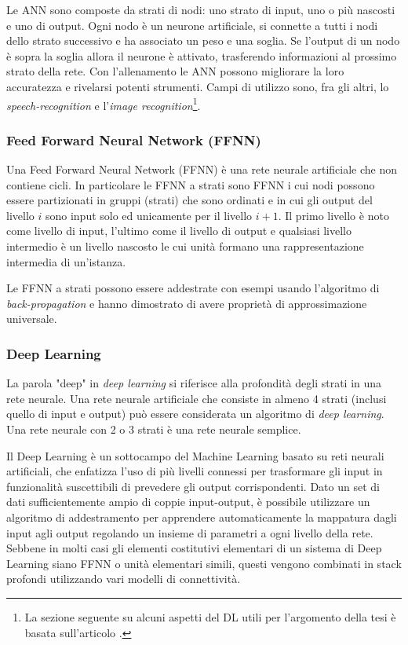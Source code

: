 \par Le ANN sono composte da strati di nodi: uno strato di input, uno o più nascosti e uno di output. Ogni nodo è un neurone artificiale, si connette a tutti i nodi dello strato successivo e ha associato un peso e una soglia. Se l'output di un nodo è sopra la soglia allora il neurone è attivato, trasferendo informazioni al prossimo strato della rete. Con l'allenamento le ANN possono migliorare la loro accuratezza e rivelarsi potenti strumenti. Campi di utilizzo sono, fra gli altri, lo \textit{speech-recognition} e l'\textit{image recognition}\footnote{La sezione seguente su alcuni aspetti del DL utili per l'argomento della tesi è basata sull'articolo .}.

\subsubsection{Feed Forward Neural Network (FFNN)}

Una Feed Forward Neural Network (FFNN) è una rete neurale artificiale che non contiene cicli. In particolare le FFNN a strati sono FFNN i cui nodi possono essere partizionati in gruppi (strati) che sono ordinati e in cui gli output del livello $i$ sono input solo ed unicamente per il livello $i+1$. Il primo livello è noto come livello di input, l'ultimo come il livello di output e qualsiasi livello intermedio è un livello nascosto le cui unità formano una rappresentazione intermedia di un'istanza. 

\par Le FFNN a strati possono essere addestrate con esempi usando l'algoritmo di \textit{back-propagation} e hanno dimostrato di avere proprietà di approssimazione universale. 

\subsubsection{Deep Learning}

La parola "deep" in \textit{deep learning} si riferisce alla profondità degli strati in una rete neurale. Una rete neurale artificiale che consiste in almeno 4 strati (inclusi quello di input e output) può essere considerata un algoritmo di \textit{deep learning}\supercite{neuralNetworksIBM}. Una rete neurale con 2 o 3 strati è una rete neurale semplice.

Il Deep Learning è un sottocampo del Machine Learning basato su reti neurali artificiali, che enfatizza l'uso di più livelli connessi per trasformare gli input in funzionalità suscettibili di prevedere gli output corrispondenti. Dato un set di dati sufficientemente ampio di coppie input-output, è possibile utilizzare un algoritmo di addestramento per apprendere automaticamente la mappatura dagli input agli output regolando un insieme di parametri a ogni livello della rete. Sebbene in molti casi gli elementi costitutivi elementari di un sistema di Deep Learning siano FFNN o unità elementari simili, questi vengono combinati in stack profondi utilizzando vari modelli di connettività. 

